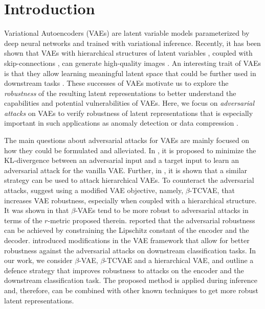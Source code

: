 \section{Introduction}\label{sec:intro}

Variational Autoencoders (VAEs) \citep{kingma2014autoencoding, rezende2014stochastic} are latent variable models parameterized by deep neural networks and trained with variational inference. Recently, it has been shown that VAEs with hierarchical structures of latent variables \citep{Ranganath2016-yg}, coupled with skip-connections \citep{maaloe2019biva, So_nderby2016-en}, can generate high-quality images \citep{Child2020-ze, vahdat2020nvae}. An interesting trait of VAEs is that they allow learning meaningful latent space that could be further used in downstream tasks \citep{bengio2013representation, higgins2017darla}. These successes of VAEs motivate us to explore the \textit{robustness} of the resulting latent representations to better understand the capabilities and potential vulnerabilities of VAEs. Here, we focus on \textit{adversarial attacks} on VAEs to verify robustness of latent representations that is especially important in such applications as anomaly detection \citep{an2015variational, maaloe2019biva} or data compression \citep{balle2018variational, habibian2019video}. 

The main questions about adversarial attacks for VAEs are mainly focused on how they could be formulated and alleviated. In \citet{Gondim-Ribeiro2018-cu}, it is proposed to minimize the KL-divergence between an adversarial input and a target input to learn an adversarial attack for the vanilla VAE. Further, in \citet{kuzina2021adv}, it is shown that a similar strategy can be used to attack hierarchical VAEs. To counteract the adversarial attacks, \citet{Willetts2019-mu} suggest using a modified VAE objective, namely, $\beta$-TCVAE, that increases VAE robustness, especially when coupled with a hierarchical structure. It was shown in \citet{camuto2021towards} that $\beta$-VAEs tend to be more robust to adversarial attacks in terms of the $r$-metric proposed therein. \citet{barrett2021certifiably} reported that the adversarial robustness can be achieved by constraining the Lipschitz constant of the encoder and the decoder. \citet{cemgil2020autoencoding, Cemgil2019-vn} introduced modifications in the VAE framework that allow for better robustness against the adversarial attacks on downstream classification tasks. In our work, we consider $\beta$-VAE, $\beta$-TCVAE and a hierarchical VAE, and outline a defence strategy that improves robustness to attacks on the encoder and the downstream classification task. The proposed method is applied during inference and, therefore, can be combined with other known techniques to get more robust latent representations.


